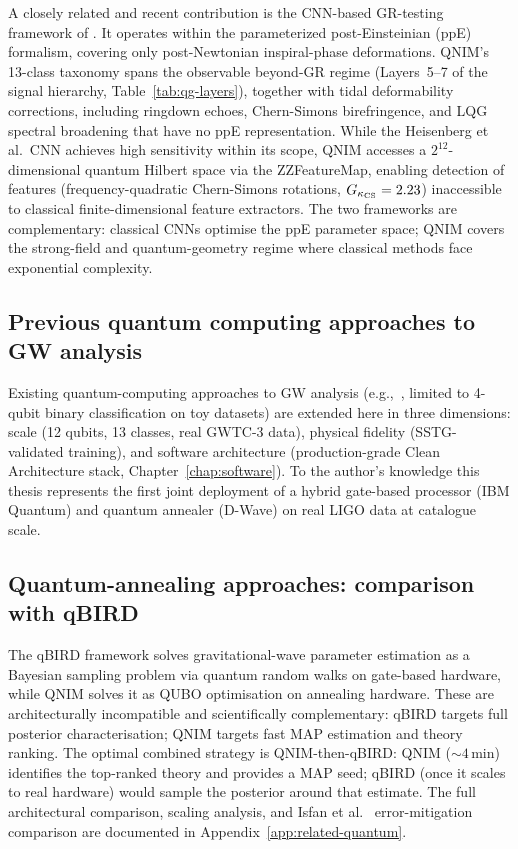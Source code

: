 \documentclass[11pt,a4paper, english]{book}
\theoremstyle{plain}
\theoremstyle{definition}
\numberwithin{equation}{chapter}
\numberwithin{figure}{chapter}
\numberwithin{table}{chapter}
\begin{document}
A closely related and recent contribution is the CNN-based GR-testing
framework of . It operates within the
parameterized post-Einsteinian (ppE) formalism, covering only
post-Newtonian inspiral-phase deformations. QNIM's 13-class taxonomy
spans the observable beyond-GR regime (Layers~5--7 
of the signal hierarchy, 
Table~\ref{tab:qg-layers}), together with tidal 
deformability corrections, including ringdown echoes,
Chern-Simons birefringence, and LQG spectral broadening that have no
ppE representation. While the Heisenberg et al.\ CNN achieves high
sensitivity within its scope, QNIM accesses a $2^{12}$-dimensional
quantum Hilbert space via the ZZFeatureMap, enabling detection of
features (frequency-quadratic Chern-Simons rotations,  $G_{\kappa_{\rm CS}} = 2.23$)
inaccessible to classical finite-dimensional feature extractors.
The two frameworks are complementary: classical CNNs optimise the
ppE parameter space; QNIM covers the strong-field and quantum-geometry
regime where classical methods face exponential complexity.

\subsection{Previous quantum computing approaches to GW analysis}
\label{subsec:disc-vs-qc}


Existing quantum-computing approaches to GW analysis (e.g.,~\cite{Gao_2022_quantum_gw}, limited to 4-qubit binary
classification on toy datasets) are extended here in three dimensions:
scale (12 qubits, 13 classes, real GWTC-3 data), physical fidelity
(SSTG-validated training), and software architecture (production-grade
Clean Architecture stack, Chapter~\ref{chap:software}).  To the
author's knowledge this thesis represents the first joint deployment of
a hybrid gate-based processor (IBM Quantum) and quantum annealer
(D-Wave) on real LIGO data at catalogue scale.

\subsection{Quantum-annealing approaches: comparison with qBIRD}
\label{subsec:disc-vs-qbird}

The qBIRD framework \cite{Escrig_2024_qBIRD} solves gravitational-wave
parameter estimation as a Bayesian sampling problem via quantum random
walks on gate-based hardware, while QNIM solves it as QUBO optimisation
on annealing hardware.  These are architecturally incompatible and
scientifically complementary: qBIRD targets full posterior
characterisation; QNIM targets fast MAP estimation and theory ranking.
The optimal combined strategy is QNIM-then-qBIRD: QNIM (${\sim}4$\,min)
identifies the top-ranked theory and provides a MAP seed; qBIRD (once
it scales to real hardware) would sample the posterior around that
estimate.  The full architectural comparison, scaling analysis, and
Isfan et al.\ \cite{Isfan_2026} error-mitigation comparison are
documented in Appendix~\ref{app:related-quantum}.
\end{document}
